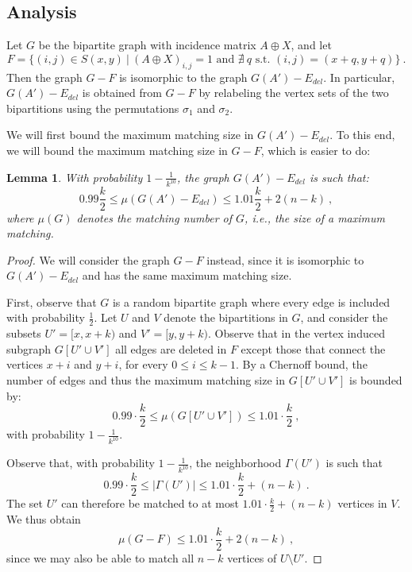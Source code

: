 \documentclass[10pt,a4paper]{article}
\newtheorem{lemma}[theorem]{Lemma}
\begin{document}
\subsection{Analysis}
Let $G$ be the bipartite graph with incidence matrix $A \oplus X$, and let 
$$F = \{ (i,j) \in S(x,y) \ | \ (A \oplus X)_{i,j} = 1 \mbox{ and } \nexists \ q \mbox{ s.t. } (i,j) = (x+q, y+q) \} \ .$$
Then the graph $G - F$ is isomorphic to the graph $G(A') - E_{del}$. In particular, 
$G(A') - E_{del}$ is obtained from $G - F$ by relabeling the vertex sets of the two bipartitions
using the permutations $\sigma_1$ and $\sigma_2$. 

We will first bound the maximum matching size in $G(A') - E_{del}$. To this end, we will bound the 
maximum matching size in $G - F$, which is easier to do:

\begin{lemma}\label{lem:matching-size}
 With probability $1-\frac{1}{k^{10}}$, the graph $G(A') - E_{del}$ is such that:
 $$0.99 \frac{k}{2} \le \mu(G(A') - E_{del}) \le 1.01 \frac{k}{2} + 2(n-k) \ ,$$
 where $\mu(G)$ denotes the \emph{matching number} of $G$, i.e., the size of a maximum matching.
\end{lemma}
\begin{proof}
 We will consider the graph $G - F$ instead, since it is isomorphic to $G(A') - E_{del}$ and has the same
 maximum matching size.
 
 First, observe that $G$ is a random bipartite graph where every edge is included with probability $\frac{1}{2}$.
 Let $U$ and $V$ denote the bipartitions in $G$, and consider the subsets $U' = [x, x+k)$ and $V' = [y, y+k)$.
 Observe that in the vertex induced subgraph $G[U' \cup V']$
 all edges are deleted in $F$ except those that connect 
 the vertices $x+i$ and $y+i$, for every $0 \le i \le k-1$. By a Chernoff bound, the number of edges and thus
 the maximum matching size in $G[U' \cup V']$ is bounded by:
 $$0.99 \cdot \frac{k}{2} \le \mu(G[U' \cup V']) \le 1.01 \cdot \frac{k}{2} \ , $$
 with probability $1 - \frac{1}{k^{10}}$.
 
 Observe that, with probability $1 - \frac{1}{k^{10}}$, the neighborhood $\Gamma(U')$ is such that 
 $$0.99 \cdot \frac{k}{2} \le |\Gamma(U')| \le 1.01 \cdot \frac{k}{2} + (n-k) \ .$$ 
 The set $U'$ can therefore be matched to at most $1.01 \cdot \frac{k}{2} + (n-k)$ vertices in $V$. 
 We thus obtain
 $$\mu(G - F) \le 1.01 \cdot \frac{k}{2} + 2(n-k) \ ,$$
 since we may also be able to match all $n-k$ vertices of $U \setminus U'$. 
\end{proof}
\end{document}
